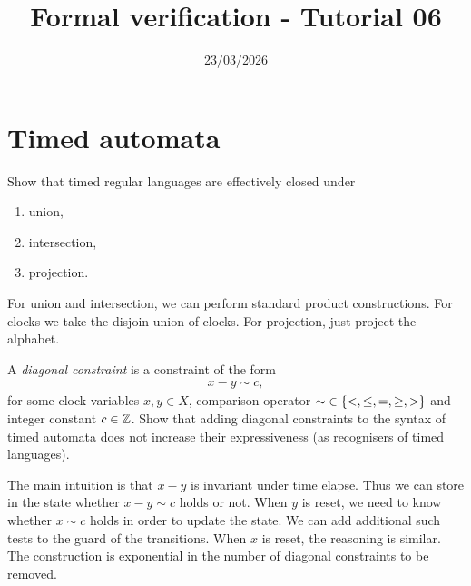 

\title{Formal verification - Tutorial 06}
\date{23/03/2026}



\maketitle

\section*{Timed automata}

\begin{exercise}
    Show that timed regular languages are effectively closed under
    \begin{enumerate}
        \item union,
        \item intersection,
        \item projection.
    \end{enumerate}
\end{exercise}
\begin{solution}
    For union and intersection, we can perform standard product constructions.
    For clocks we take the disjoin union of clocks.
    For projection, just project the alphabet.
\end{solution}

\begin{exercise}
    A \emph{diagonal constraint} is a constraint of the form
    \begin{align*}
        x - y \sim c,
    \end{align*}
    for some clock variables $x, y \in X$,
    comparison operator ${\sim} \in \left\{<, \leq, =, \geq, >\right\}$
    and integer constant $c \in \mathbb Z$.
    Show that adding diagonal constraints to the syntax of timed automata
    does not increase their expressiveness
    (as recognisers of timed languages).
\end{exercise}
\begin{solution}
    The main intuition is that $x - y$ is invariant under time elapse.
    Thus we can store in the state whether $x - y \sim c$ holds or not.
    When $y$ is reset, we need to know whether $x \sim c$ holds in order to update the state.
    We can add additional such tests to the guard of the transitions.
    When $x$ is reset, the reasoning is similar.
    The construction is exponential in the number of diagonal constraints to be removed.
\end{solution}

